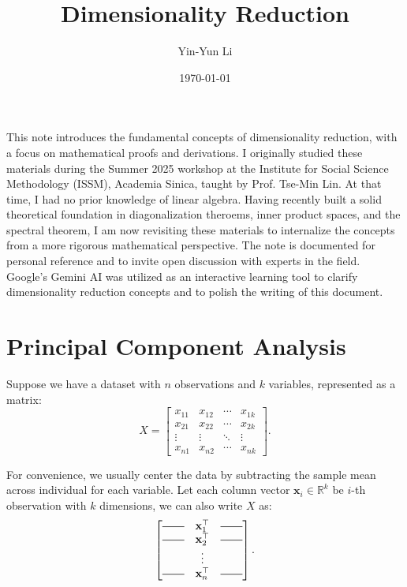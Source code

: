 \documentclass[12pt]{article}
\title{Dimensionality Reduction}
\author{Yin-Yun Li}
\date{\today}
\begin{document}
\maketitle
This note introduces the fundamental concepts of dimensionality reduction, with a focus on mathematical proofs and derivations. I originally studied these materials during the Summer 2025 workshop at the Institute for Social Science Methodology (ISSM), Academia Sinica, taught by Prof. Tse-Min Lin. At that time, I had no prior knowledge of linear algebra. Having recently built a solid theoretical foundation in diagonalization theroems, inner product spaces, and the spectral theorem, I am now revisiting these materials to internalize the concepts from a more rigorous mathematical perspective. The note is documented for personal reference and to invite open discussion with experts in the field.
Google's Gemini AI was utilized as an interactive learning tool to clarify dimensionality reduction concepts and to polish the writing of this document.
\\
\tableofcontents

\newpage
\section{Principal Component Analysis}

Suppose we have a dataset with $n$ observations and $k$ variables, represented as a matrix:
\[X = 
\begin{bmatrix}
x_{11} & x_{12} & \cdots & x_{1k} \\
x_{21} & x_{22} & \cdots & x_{2k} \\
\vdots & \vdots & \ddots & \vdots \\
x_{n1} & x_{n2} & \cdots & x_{nk}
\end{bmatrix}.\]

For convenience, we usually center the data by subtracting the sample mean across individual for each variable.
Let each column vector $\mathbf{x}_i\in\mathbb{R}^k$ be $i$-th observation with $k$ dimensions, we can also write $X$ as:
\[\begin{bmatrix}
\rule[2pt]{20pt}{0.5pt} \quad \mathbf{x}_1^\top \quad \rule[2pt]{20pt}{0.5pt} \\
\rule[2pt]{20pt}{0.5pt} \quad \mathbf{x}_2^\top \quad \rule[2pt]{20pt}{0.5pt} \\
\vdots \\
\rule[2pt]{20pt}{0.5pt} \quad \mathbf{x}_n^\top \quad \rule[2pt]{20pt}{0.5pt}
\end{bmatrix}.\]
\end{document}
